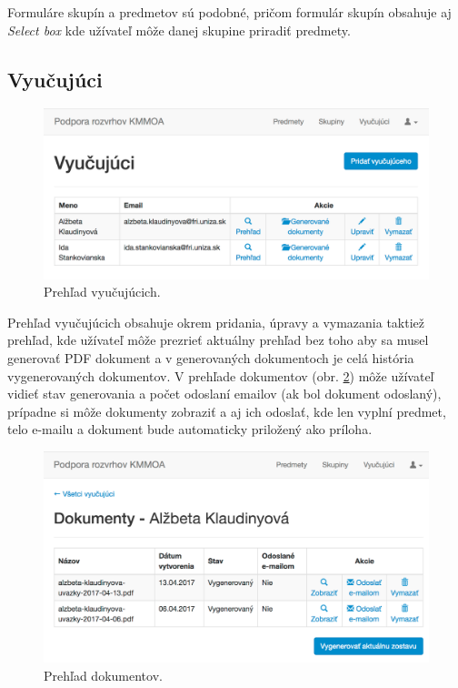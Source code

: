 Formuláre skupín a predmetov sú podobné, pričom formulár skupín obsahuje aj \emph{Select box} kde užívateľ môže danej skupine priradiť predmety.

\subsection{Vyučujúci}

\begin{figure}[!htb]
  \centering
  \includegraphics[width=1\textwidth]{content/images/ui/teachers}
  \caption{Prehľad vyučujúcich.}
  \label{fig:courses}
\end{figure}

Prehľad vyučujúcich obsahuje okrem pridania, úpravy a vymazania taktiež prehľad, kde užívateľ môže prezrieť aktuálny prehľad bez toho aby sa musel generovať PDF dokument a v generovaných dokumentoch je celá história vygenerovaných dokumentov. V prehľade dokumentov (obr. \ref{fig:reports}) môže užívateľ vidieť stav generovania a počet odoslaní emailov (ak bol dokument odoslaný), prípadne si môže dokumenty zobraziť a aj ich odoslať, kde len vyplní predmet, telo e-mailu a dokument bude automaticky priložený ako príloha.

\clearpage
\begin{figure}[!htb]
  \centering
  \includegraphics[width=1\textwidth]{content/images/ui/reports}
  \caption{Prehľad dokumentov.}
  \label{fig:reports}
\end{figure}

